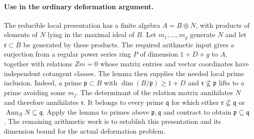 \paragraph{Use in the ordinary deformation argument.}
The reducible local presentation has a finite algebra $A=B\oplus N$,
with products of elements of $N$ lying in the maximal ideal of $B$.
Let $m_1,\ldots,m_g$ generate $N$ and let
$\mathfrak r\subset B$ be generated by these products.  The required
arithmetic input gives a surjection from a regular power series ring
$P$ of dimension $1+D+g$ to $A$, together with relations $Zm=0$ whose
matrix entries and vector coordinates have independent cotangent
classes.  The lemma then supplies the needed local prime inclusion.
Indeed, a prime $\mathfrak p\subset B$ with
$\dim(B/\mathfrak p)\geq1+D$ and
$\mathfrak r\nsubseteq\mathfrak p$ lifts to a prime avoiding some
$m_j$.  The determinant of the relation matrix annihilates $N$ and
therefore annihilates $\mathfrak r$.  It belongs to every prime
$\mathfrak q$ for which either $\mathfrak r\nsubseteq\mathfrak q$ or
$\operatorname{Ann}_B N\subseteq\mathfrak q$.  Apply the lemma to primes
above $\mathfrak p,\mathfrak q$ and contract to obtain
$\mathfrak p\subseteq\mathfrak q$.
The remaining arithmetic work is to establish this presentation and
its dimension bound for the actual deformation problem.
